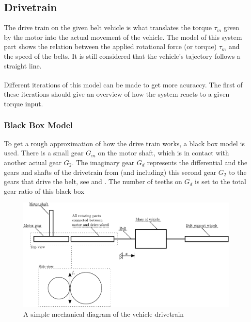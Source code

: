 \subsection{Drivetrain}\label{Drivetrain}

The drive train on the given belt vehicle is what translates the torque $\tau_m$ given by the motor into the actual movement of the vehicle. The model of this system part shows the relation between the applied rotational force (or torque) $\tau_m$ and the speed of the belts. It is still considered that the vehicle's tajectory follows a straight line.\\\\
%
Different iterations of this model can be made to get more acuraccy. The first of these iterations should give an overview of how the system reacts to a given torque input. 

\subsubsection{Black Box Model}\label{BlackBoxModel}
To get a rough approximation of how the drive train works, a black box model is used. There is a small gear $G_m$ on the motor shaft, which is in contact with another actual gear $G_2$. The imaginary gear $G_d$ represents the differential and the gears and shafts of the drivetrain from (and including) this second gear $G_2$ to the gears that drive the belt, see  and . The number of teeths on $G_d$ is set to the total gear ratio of this black box

\begin{figure}[H]
	\centering
	\includegraphics[scale=0.8]{figures/mechanicalDrawing.pdf}
	\caption{A simple mechanical diagram of the vehicle drivetrain}
	\label{fig:DrivetrainMechanicalModel}
\end{figure}

